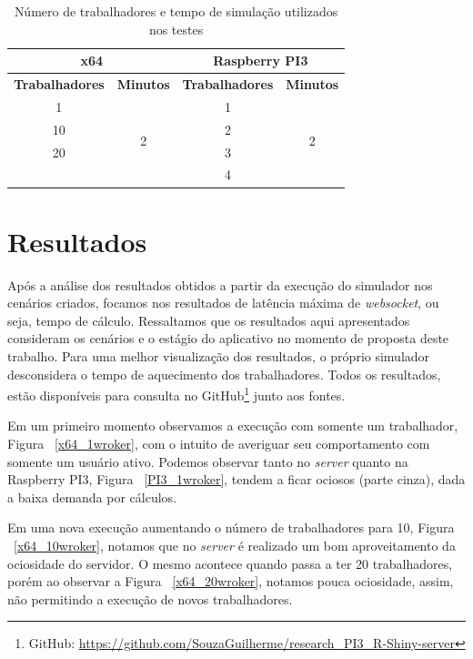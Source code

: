 \documentclass[12pt,english,brazil]{article}
\begin{document}
\begin{table}[htbp]
\centering
\caption{Número de trabalhadores e tempo de simulação utilizados nos testes}
\begin{tabular}{c|c|cc}
\hline
\multicolumn{2}{c|}{\textbf{x64}}           & \multicolumn{2}{c}{\textbf{Raspberry PI3}}                       \\ \hline
\textbf{Trabalhadores} & \textbf{Minutos}   & \multicolumn{1}{c|}{\textbf{Trabalhadores}} & \textbf{Minutos}   \\ \hline
1                      & \multirow{4}{*}{2} & \multicolumn{1}{c|}{1}                      & \multirow{4}{*}{2} \\ \cline{1-1} \cline{3-3}
10        &  & \multicolumn{1}{c|}{2} &  \\ \cline{1-1} \cline{3-3}
20        &  & \multicolumn{1}{c|}{3} &  \\ \cline{1-1} \cline{3-3}
\textbf{} &  & \multicolumn{1}{c|}{4} &  \\ \hline
\end{tabular}
\end{table}

\section{Resultados} \label{sec:Resultados}
Após a análise dos resultados obtidos a partir da execução do simulador nos cenários criados, focamos nos resultados de latência máxima de \emph{websocket}, ou seja, tempo de cálculo. Ressaltamos que os resultados aqui apresentados consideram os cenários e o estágio do aplicativo no momento de proposta deste trabalho. Para uma melhor visualização dos resultados, o próprio simulador desconsidera o tempo de aquecimento dos trabalhadores. Todos os resultados, estão disponíveis para consulta no GitHub\footnote{GitHub: \url{https://github.com/SouzaGuilherme/research_PI3_R-Shiny-server}} junto aos fontes.

Em um primeiro momento observamos a execução com somente um trabalhador, Figura ~\ref{x64_1wroker}, com o intuito de averiguar seu comportamento com somente um usuário ativo. Podemos observar tanto no \emph{server} quanto na Raspberry PI3, Figura ~\ref{PI3_1wroker}, tendem a ficar ociosos (parte cinza), dada a baixa demanda por cálculos. 

Em uma nova execução aumentando o número de trabalhadores para 10, Figura ~\ref{x64_10wroker}, notamos que no \emph{server} é realizado um bom aproveitamento da ociosidade do servidor. O mesmo acontece quando passa a ter 20 trabalhadores, porém ao observar a Figura ~\ref{x64_20wroker}, notamos pouca ociosidade, assim, não permitindo a execução de novos trabalhadores.
\end{document}

